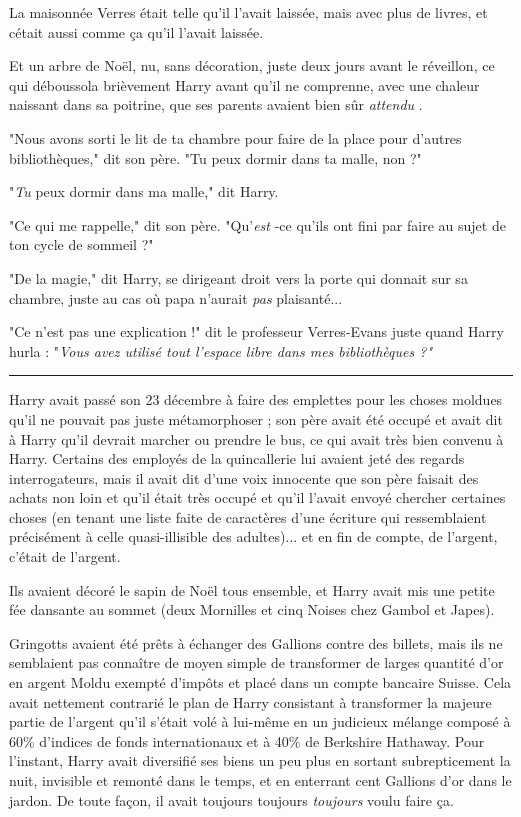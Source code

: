 La maisonnée Verres était telle qu'il l'avait laissée, mais avec plus de livres, et cétait aussi comme ça qu'il l'avait laissée.

Et un arbre de Noël, nu, sans décoration, juste deux jours avant le réveillon, ce qui déboussola brièvement Harry avant qu'il ne comprenne, avec une chaleur naissant dans sa poitrine, que ses parents avaient bien sûr \emph{attendu} .

"Nous avons sorti le lit de ta chambre pour faire de la place pour d'autres bibliothèques," dit son père. "Tu peux dormir dans ta malle, non ?"

"\emph{Tu}  peux dormir dans ma malle," dit Harry.

"Ce qui me rappelle," dit son père. "Qu'\emph{est} -ce qu'ils ont fini par faire au sujet de ton cycle de sommeil ?"

"De la magie," dit Harry, se dirigeant droit vers la porte qui donnait sur sa chambre, juste au cas où papa n'aurait \emph{pas}  plaisanté...

"Ce n'est pas une explication !" dit le professeur Verres-Evans juste quand Harry hurla : "\emph{Vous avez utilisé tout l'espace libre dans mes bibliothèques ?"} 
\par\noindent\rule{\textwidth}{0.4pt}
Harry avait passé son 23 décembre à faire des emplettes pour les choses moldues qu'il ne pouvait pas juste métamorphoser ; son père avait été occupé et avait dit à Harry qu'il devrait marcher ou prendre le bus, ce qui avait très bien convenu à Harry. Certains des employés de la quincallerie lui avaient jeté des regards interrogateurs, mais il avait dit d'une voix innocente que son père faisait des achats non loin et qu'il était très occupé et qu'il l'avait envoyé chercher certaines choses (en tenant une liste faite de caractères d'une écriture qui ressemblaient précisément à celle quasi-illisible des adultes)... et en fin de compte, de l'argent, c'était de l'argent.

Ils avaient décoré le sapin de Noël tous ensemble, et Harry avait mis une petite fée dansante au sommet (deux Mornilles et cinq Noises chez Gambol et Japes).

Gringotts avaient été prêts à échanger des Gallions contre des billets, mais ils ne semblaient pas connaître de moyen simple de transformer de larges quantité d'or en argent Moldu exempté d'impôts et placé dans un compte bancaire Suisse. Cela avait nettement contrarié le plan de Harry consistant à transformer la majeure partie de l'argent qu'il s'était volé à lui-même en un judicieux mélange composé à 60\% d'indices de fonds internationaux et à 40\% de Berkshire Hathaway. Pour l'instant, Harry avait diversifié ses biens un peu plus en sortant subrepticement la nuit, invisible et remonté dans le temps, et en enterrant cent Gallions d'or dans le jardon. De toute façon, il avait toujours toujours \emph{toujours}  voulu faire ça.

